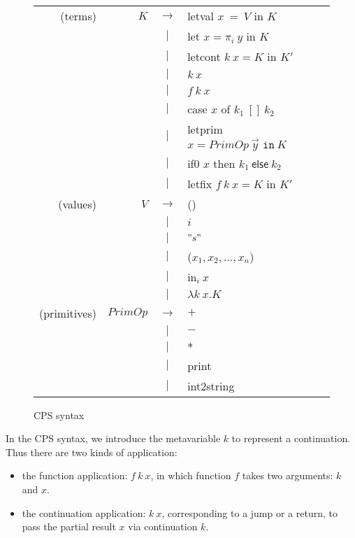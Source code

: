 \documentclass{article}
\theoremstyle{definition}
\theoremstyle{remark}
\numberwithin{equation}{section}
\begin{document}
\begin{figure}[!ht]
  \centering
\begin{tabular}{rrcl}
(terms) & $K$ & $\to$ & \textsf{letval }$x\ =\ V$ \textsf{ in } $K$ \\
        &     & $|$ & \textsf{let }$x = \pi _i\ y$\textsf{ in }$K$\\
        &     & $|$ & \textsf{letcont }$k\ x = K$\textsf{ in }$K'$\\
        &     & $|$ &  $k\ x$ \\
        &     & $|$ & $f\ k\ x$ \\
        &     & $|$ & \textsf{case} $x$ \textsf{of} $k_1\ [\!]\ k_2$\\
        &     & $|$ & \textsf{letprim} $x=PrimOp\ \vec{y}
         \texttt{ in}\ K$\\
        &     & $|$ &\textsf{if0} $x$ \textsf{then} $k_1\ \textsf{else}\ k_2$\\
        &     & $|$ &\textsf{letfix }$f\ k\ x=K$\textsf{ in }$K'$\\

(values) & $V$ & $\to$ & () \\
        &     & $|$ & $i$\\
        &     & $|$ & $"s"$\\
        &     & $|$ & ($x_1,x_2, ..., x_n$)\\
        &     & $|$ & \textsf{in}$_i\ x$\\
        &     & $|$ &  $\lambda k\ x.K$ \\

(primitives) & $PrimOp$ & $\to$ & $+$ \\
        &     & $|$ & $-$\\
        &     & $|$ & $*$\\
        &     & $|$ & \textsf{print}\\
        &     & $|$ & \textsf{int2string}\\
\end{tabular}
  \caption{CPS syntax}
  \label{fig-sub}
\end{figure}

In the CPS syntax, we introduce the metavariable $k$ to represent
a continuation. Thus there are two kinds of application:
\begin{itemize}
  \item the function application: $f\ k\ x$, in which function
$f$ takes two arguments: $k$ and $x$.
  \item the continuation application: $k\ x$, corresponding to a jump
   or a return, to pass the partial result $x$ via continuation $k$.
\end{itemize}
\end{document}
